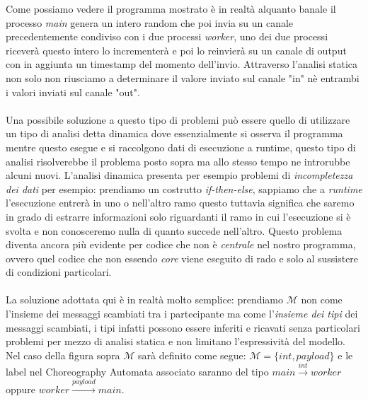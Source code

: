 
Come possiamo vedere il programma mostrato è in realtà alquanto banale il processo \emph{main} genera un intero random che poi invia su un canale precedentemente condiviso con i due processi \emph{worker}, uno dei due processi riceverà questo intero lo incrementerà e poi lo reinvierà su un canale di output con in aggiunta un timestamp del momento dell'invio. Attraverso l'analisi statica non solo non riusciamo a determinare il valore inviato sul canale "in" nè entrambi i valori inviati sul canale "out". \\\\
Una possibile soluzione a questo tipo di problemi può essere quello di utilizzare un tipo di analisi detta dinamica dove essenzialmente si osserva il programma mentre questo esegue e si raccolgono dati di esecuzione a runtime, questo tipo di analisi risolverebbe il problema posto sopra ma allo stesso tempo ne introrubbe alcuni nuovi. L'analisi dinamica presenta per esempio problemi di \emph{incompletezza dei dati} per esempio: prendiamo un costrutto \emph{if-then-else}, sappiamo che a \emph{runtime} l'esecuzione entrerà in uno o nell'altro ramo questo tuttavia significa che saremo in grado di estrarre informazioni solo riguardanti il ramo in cui l'esecuzione si è svolta e non conosceremo nulla di quanto succede nell'altro. Questo problema diventa ancora più evidente per codice che non è \emph{centrale} nel nostro programma, ovvero quel codice che non essendo \emph{core} viene eseguito di rado e solo al sussistere di condizioni particolari.\\\\
La soluzione adottata qui è in realtà molto semplice: prendiamo $\mathcal{M}$ non come l'insieme dei messaggi scambiati tra i partecipante ma come l'\emph{insieme dei tipi} dei messaggi scambiati, i tipi infatti possono essere inferiti e ricavati senza particolari problemi per mezzo di analisi statica e non limitano l'espressività del modello. Nel caso della figura sopra $\mathcal{M}$ sarà definito come segue: $\mathcal{M} = \{ int, payload \}$ e le label nel Choreography Automata associato saranno del tipo $main \xrightarrow{int} worker$ oppure $worker \xrightarrow{payload} main$.

